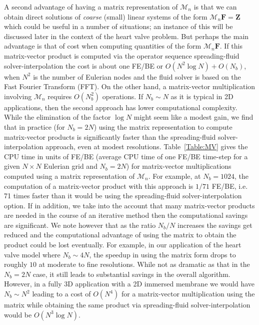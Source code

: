 \documentclass[preprint,12pt]{elsarticle}
\begin{document}
 A second advantage of having a matrix representation of $\mathcal{M}_n$ is that we can obtain direct solutions of {\em coarse} (small) linear systems of the form $\mathcal{M}_n\mathbf{F}=\mathbf{Z}$ which could be useful in a number of situations; an instance of this will be discussed later in the context of the heart valve problem. But perhaps the main advantage is that of cost when 
 computing quantities of the form  $\mathcal{M}_n\mathbf{F}$.  If this matrix-vector product is computed via the operator sequence  spreading-fluid solver-interpolation the cost is about one FE/BE or $O(N^2\log N) + O(N_b)$, when $N^2$ is the number of Eulerian nodes and the fluid solver is based on the Fast Fourier Transform (FFT).  
 On the other hand, a matrix-vector multiplication involving $\mathcal{M}_n$ requires $O(N_b^2)$ operations.  If  $N_b \sim N$ as it is typical in 2D applications, then the second approach has lower computational complexity. While
 the elimination of the factor $\log N$ might seem like a modest gain, we find that in practice (for $N_b=2N$) using the 
 matrix representation to compute matrix-vector products is significantly faster  than the spreading-fluid solver-interpolation approach, even at modest resolutions.  Table~\ref{Table:MV} gives the CPU time in units of FE/BE (average CPU time of one FE/BE time-step for a given $N\times N$ Eulerian grid and $N_b=2N$) for matrix-vector multiplications computed using a matrix representation of  $\mathcal{M}_n$.  For example, at $N_b=1024$,  the computation of a matrix-vector product with this approach is $1/71$ FE/BE, i.e.
  71 times faster than it would be using the spreading-fluid solver-interpolation option.
  If in addition,  we take into the account that many matrix-vector products are needed in the course of an iterative method then the computational savings are significant. We note however that as the ratio $N_b/N$ increases the savings get reduced and the computational advantage of using the matrix to obtain the product could be lost eventually. For example, in our application of the heart valve model where $N_b  \sim 4N$, the speedup in using the matrix form drops to roughly $10$ at moderate to fine resolutions. While not as dramatic as that in the $N_b=2N$ case, it still leads to substantial savings in the overall algorithm.  However, 
  in a fully 3D application with a 2D immersed membrane we would have $N_b \sim N^2$ leading to a cost of  $O(N^4)$ for 
   a matrix-vector multiplication using the matrix  while obtaining the same product via spreading-fluid solver-interpolation would be $O(N^3\log N)$. 
  
\end{document}
